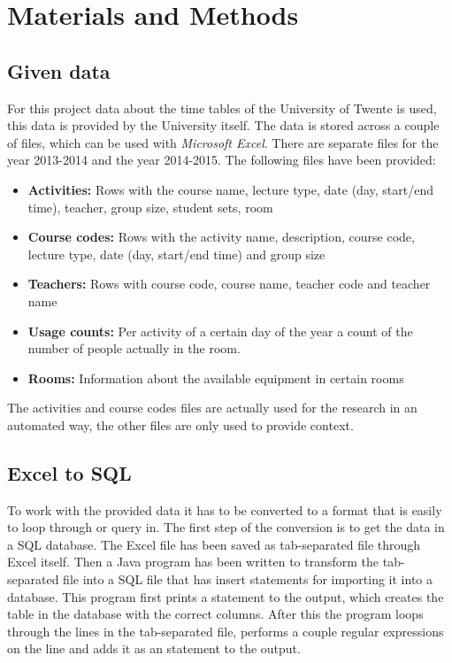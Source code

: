 \section{Materials and Methods}
\subsection{Given data}
For this project data about the time tables of the University of Twente is used, this data is provided by the University itself. The data is stored across a couple of  files, which can be used with \emph{Microsoft Excel}. There are separate files for the year 2013-2014 and the year 2014-2015. The following files have been provided:

\begin{itemize}
	\item \textbf{Activities:} Rows with the course name, lecture type, date (day, start/end time), teacher, group size, student sets, room
	\item \textbf{Course codes:} Rows with the activity name, description, course code, lecture type, date (day, start/end time) and group size
	\item \textbf{Teachers:} Rows with course code, course name, teacher code and teacher name
	\item \textbf{Usage counts:} Per activity of a certain day of the year a count of the number of people actually in the room.
	\item\textbf{Rooms:} Information about the available equipment in certain rooms
\end{itemize}

The activities and course codes files are actually used for the research in an automated way, the other files are only used to provide context.

\subsection{Excel to SQL}
To work with the provided data it has to be converted to a format that is easily to loop through or query in. The first step of the conversion is to get the data in a SQL database. The Excel file has been saved as tab-separated file through Excel itself. Then a Java program has been written to transform the tab-separated file into a SQL file that has insert statements for importing it into a database. This program first prints a  statement to the output, which creates the table in the database with the correct columns. After this the program loops through the lines in the tab-separated file, performs a couple regular expressions on the line and adds it as an  statement to the output.

